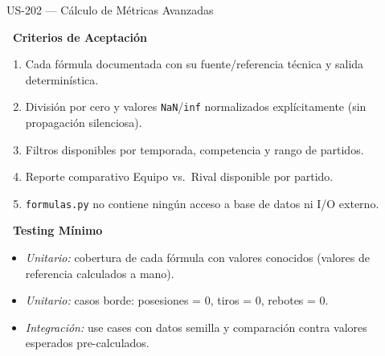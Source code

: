 \documentclass[11pt,a4paper]{article}
\newcommand{\fpath}[1]{\texttt{\small #1}}
\newcommand{\usfield}[2][\;]{%
  \par\vspace{5pt}%
  {\small\textbf{\textcolor{primary}{#2}}}\par\vspace{2pt}%
}
\begin{document}
\begin{uscard}{US-202 — Cálculo de Métricas Avanzadas}
\usfield{\faCheckCircle\ Criterios de Aceptación}
\begin{enumerate}[label=\textcolor{accent}{\textbf{AC\arabic*.}}, nosep, leftmargin=2.2em]
  \item Cada fórmula documentada con su fuente/referencia técnica y salida determinística.
  \item División por cero y valores \fpath{NaN}/\fpath{inf} normalizados explícitamente (sin propagación silenciosa).
  \item Filtros disponibles por temporada, competencia y rango de partidos.
  \item Reporte comparativo Equipo vs.\ Rival disponible por partido.
  \item \fpath{formulas.py} no contiene ningún acceso a base de datos ni I/O externo.
\end{enumerate}

\usfield{\faFlask\ Testing Mínimo}
\begin{itemize}[nosep, leftmargin=1.6em]
  \item \textit{Unitario:} cobertura de cada fórmula con valores conocidos (valores de referencia calculados a mano).
  \item \textit{Unitario:} casos borde: posesiones = 0, tiros = 0, rebotes = 0.
  \item \textit{Integración:} use cases con datos semilla y comparación contra valores esperados pre-calculados.
\end{itemize}

\end{uscard}
\end{document}
